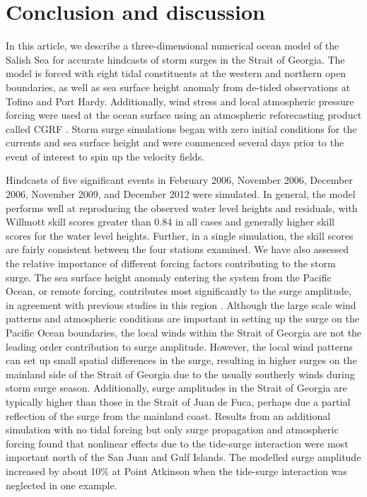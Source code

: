 \documentclass[letterpaper]{tATO2e}
\begin{document}
\section{Conclusion and discussion}\label{sec:diss}
In this article, we describe a three-dimensional numerical ocean model of the Salish Sea for accurate hindcasts of storm surges in the Strait of Georgia. The model is forced with eight tidal constituents at the western and northern open boundaries, as well as sea surface height anomaly from de-tided observations at Tofino and Port Hardy. Additionally, wind stress and local atmospheric pressure forcing were used at the ocean surface using an atmospheric reforecasting product called CGRF \citep{smith2014new}. Storm surge simulations began with zero initial conditions for the currents and sea surface height and were commenced several days prior to the event of interest to spin up the velocity fields. 

Hindcasts of five significant events in February 2006, November 2006, December 2006, November 2009, and December 2012 were simulated. In general, the model performs well at reproducing the observed water level heights and residuals, with Willmott skill scores greater than {\color{red}0.84} in all cases and generally higher skill scores for the water level heights.  Further, in a single simulation, the skill scores are fairly consistent between the four stations examined. We have also assessed the relative importance of different forcing factors contributing to the storm surge. The sea surface height anomaly entering the system from the Pacific Ocean, or remote forcing,  contributes most significantly to the surge amplitude, in agreement with previous studies in this region \citep{murty1995storm}. Although the large scale wind patterns and atmospheric conditions are important in setting up the surge on the Pacific Ocean boundaries, the local winds within the Strait of Georgia are not the leading order contribution to surge amplitude. However, the local wind patterns can set up small spatial differences in the surge, resulting in higher surges on the mainland side of the Strait of Georgia due to the usually southerly winds during storm surge season. {\color{red}Additionally, surge amplitudes in the Strait of Georgia are typically higher than those in the Strait of Juan de Fuca, perhaps due a partial reflection of the surge from the mainland coast.} Results from an additional simulation with no tidal forcing but only surge propagation and atmospheric forcing found that nonlinear effects due to the tide-surge interaction were most important north of the San Juan and Gulf Islands. The modelled surge amplitude increased by about 10\% at Point Atkinson when the tide-surge interaction was neglected in one example. 
\end{document}
